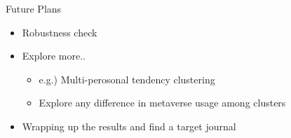 \documentclass[
  ignorenonframetext,
]{beamer}
\providecommand{\tightlist}{%
  \setlength{\itemsep}{0pt}\setlength{\parskip}{0pt}}\usepackage{longtable,booktabs,array}
\begin{document}
\begin{frame}{Future Plans}
\protect\hypertarget{future-plans}{}
\begin{itemize}
\tightlist
\item
  Robustness check
\end{itemize}

\begin{itemize}
\item
  Explore more..

  \begin{itemize}
  \item
    e.g.) Multi-perosonal tendency clustering
  \item
    Explore any difference in metaverse usage among clusters
  \end{itemize}
\end{itemize}

\begin{itemize}
\tightlist
\item
  Wrapping up the results and find a target journal
\end{itemize}
\end{frame}
\end{document}
